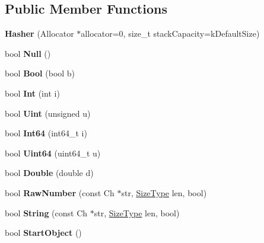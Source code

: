 \subsection*{Public Member Functions}
\begin{DoxyCompactItemize}
\item 
\mbox{\label{a02368_a7b6abfdd3bdc60064a2322cdd20708c1}} 
{\bfseries Hasher} (Allocator $\ast$allocator=0, size\+\_\+t stack\+Capacity=k\+Default\+Size)
\item 
\mbox{\label{a02368_a57c656866aa08cc7c448ce47b7a243c3}} 
bool {\bfseries Null} ()
\item 
\mbox{\label{a02368_a11efd784a4e9c4f8a3dc281552df0486}} 
bool {\bfseries Bool} (bool b)
\item 
\mbox{\label{a02368_aadbadf98ee7c9ab03a636e0f06d38bac}} 
bool {\bfseries Int} (int i)
\item 
\mbox{\label{a02368_a4401600c24c817a45cea6c281438e5b4}} 
bool {\bfseries Uint} (unsigned u)
\item 
\mbox{\label{a02368_ae0579cd54b3c545f77452543793b9a97}} 
bool {\bfseries Int64} (int64\+\_\+t i)
\item 
\mbox{\label{a02368_a14832ac4ec204f1065b929df2c255457}} 
bool {\bfseries Uint64} (uint64\+\_\+t u)
\item 
\mbox{\label{a02368_a83abe847e24ed88d5aab092d840e37c1}} 
bool {\bfseries Double} (double d)
\item 
\mbox{\label{a02368_ae277289ad2fb3a938a6507e566d3c5e2}} 
bool {\bfseries Raw\+Number} (const Ch $\ast$str, \hyperlink{a00560_a5ed6e6e67250fadbd041127e6386dcb5}{Size\+Type} len, bool)
\item 
\mbox{\label{a02368_a885f2bf42f2bb64d6f9443129dce3883}} 
bool {\bfseries String} (const Ch $\ast$str, \hyperlink{a00560_a5ed6e6e67250fadbd041127e6386dcb5}{Size\+Type} len, bool)
\item 
\mbox{\label{a02368_a1607d6cac3daab9725e442e38d121028}} 
bool {\bfseries Start\+Object} ()

\end{DoxyCompactItemize}
